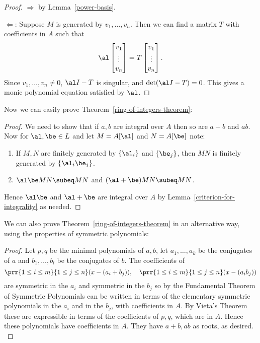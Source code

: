 \begin{proof} $\Rightarrow$ by Lemma~\ref{power-basis}.

\noindent $\Leftarrow$: Suppose $M$ is generated by $v_1,\ldots, v_n$. Then we can find a matrix $T$ with coefficients in $A$ such that
\[\al \begin{bmatrix}v_1\\ \vdots \\ v_n\end{bmatrix}=
T\begin{bmatrix}v_1\\ \vdots \\ v_n\end{bmatrix}.\]
Since $v_1,\ldots, v_n\neq 0$, $\al I-T$ is singular, and $\det(\al I-T)=0$. This gives a monic polynomial equation satisfied by $\al$.
\end{proof}

\noindent Now we can easily prove Theorem~\ref{ring-of-integers-theorem}:

\begin{proof}
We need to show that if $a,b$ are integral over $A$ then so are $a+b$ and $ab$.
Now for $\al, \be\in L$ and let $M=A[\al]$ and $N=A[\be]$ note:
\begin{enumerate}
\item If $M,N$ are finitely generated by $\{\al_i\}$ and $\{\be_j\}$, then $MN$ is finitely generated by $\{\al_i\be_j\}$.
\item $\al\be MN\subeq MN$ and $(\al+\be)MN\subeq MN$.
\end{enumerate}
Hence $\al\be$ and $\al+\be$ are integral over $A$ by Lemma~\ref{criterion-for-integrality} as needed.
\end{proof}

\noindent We can also prove Theorem~\ref{ring-of-integers-theorem} in an alternative way, using the properties of symmetric polynomials:

\begin{proof}
Let $p,q$ be the minimal polynomials of $a,b$, let $a_1,\ldots, a_k$ be the conjugates of $a$ and $b_1,\ldots, b_l$ be the conjugates of $b$. %
The coefficients of
\[%
\prr{1\le i\le m}{1\le j\le n} (x-(a_i+b_j)),\quad \prr{1\le i\le m}{1\le j\le n} (x-(a_ib_j))\]%
are symmetric in the $a_i$ and symmetric in the $b_j$ so by the Fundamental Theorem of Symmetric Polynomials can be written in terms of the elementary symmetric polynomials in the $a_i$ and in the $b_j$, with coefficients in $A$. By Vieta's Theorem these are expressible in terms of the coefficients of $p,q$, which are in $A$. Hence these polynomials have coefficients in $A$. They have $a+b,ab$ as roots, as desired.\\
\end{proof}

